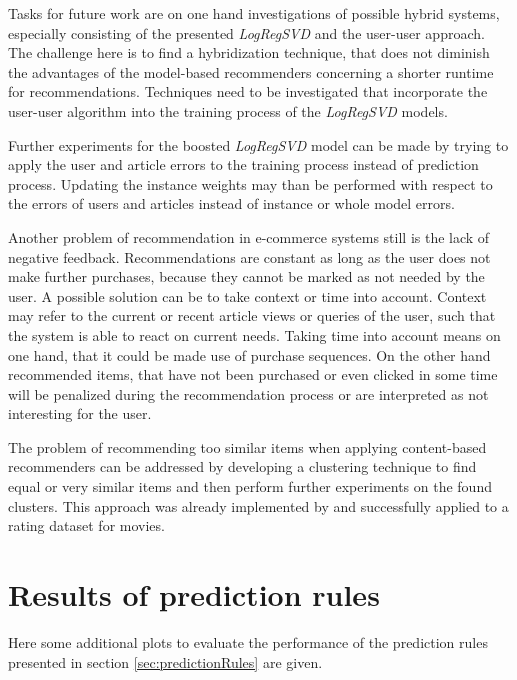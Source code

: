 \documentclass[10pt]{reportMaster}
\begin{document}
Tasks for future work are on one hand investigations of possible hybrid systems, especially consisting of the presented \textit{LogRegSVD} and the user-user approach.
The challenge here is to find a hybridization technique, that does not diminish the advantages of the model-based recommenders concerning a shorter runtime for recommendations.
Techniques need to be investigated that incorporate the user-user algorithm into the training process of the \textit{LogRegSVD} models.

Further experiments for the boosted \textit{LogRegSVD} model can be made by trying to apply the user and article errors to the training process instead of prediction process.
Updating the instance weights may than be performed with respect to the errors of users and articles instead of instance or whole model errors.

Another problem of recommendation in e-commerce systems still is the lack of negative feedback.
Recommendations are constant as long as the user does not make further purchases, because they cannot be marked as not needed by the user.
A possible solution can be to take context or time into account.
Context may refer to the current or recent article views or queries of the user, such that the system is able to react on current needs.
Taking time into account means on one hand, that it could be made use of purchase sequences.
On the other hand recommended items, that have not been purchased or even clicked in some time will be penalized during the recommendation process or are interpreted as not interesting for the user.

The problem of recommending too similar items when applying content-based recommenders can be addressed by developing a clustering technique to find equal or very similar items and then perform further experiments on the found clusters. 
This approach was already implemented by \cite{hybridCFCBClustringLi} and successfully applied to a rating dataset for movies. 






\appendix
	\chapter{Results of prediction rules}
	\label{app:predRulesExperiments}
	Here some additional plots to evaluate the performance of the prediction rules presented in section \ref{sec:predictionRules} are given.
	
\end{document}
